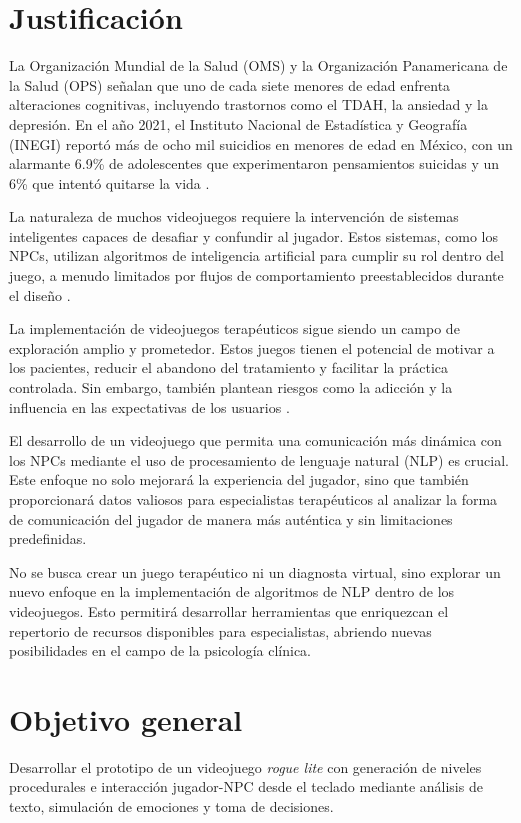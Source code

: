 \documentclass[12pt,twoside]{article}
\begin{document}
	\clearpage
	\section{Justificación}
	
	La Organización Mundial de la Salud (OMS) y la Organización Panamericana de la Salud (OPS) señalan que uno de cada siete menores de edad enfrenta alteraciones cognitivas, incluyendo trastornos como el TDAH, la ansiedad y la depresión. En el año 2021, el Instituto Nacional de Estadística y Geografía (INEGI) reportó más de ocho mil suicidios en menores de edad en México, con un alarmante 6.9\% de adolescentes que experimentaron pensamientos suicidas y un 6\% que intentó quitarse la vida \cite{info: justificacion1}.
 	
 	La naturaleza de muchos videojuegos requiere la intervención de sistemas inteligentes capaces de desafiar y confundir al jugador. Estos sistemas, como los NPCs, utilizan algoritmos de inteligencia artificial para cumplir su rol dentro del juego, a menudo limitados por flujos de comportamiento preestablecidos durante el diseño \cite{info: justificacion2}. 
 	
 	La implementación de videojuegos terapéuticos sigue siendo un campo de exploración amplio y prometedor. Estos juegos tienen el potencial de motivar a los pacientes, reducir el abandono del tratamiento y facilitar la práctica controlada. Sin embargo, también plantean riesgos como la adicción y la influencia en las expectativas de los usuarios \cite{info: justificacion3}.
 	
	 El desarrollo de un videojuego que permita una comunicación más dinámica con los NPCs mediante el uso de procesamiento de lenguaje natural (NLP) es crucial. Este enfoque no solo mejorará la experiencia del jugador, sino que también proporcionará datos valiosos para especialistas terapéuticos al analizar la forma de comunicación del jugador de manera más auténtica y sin limitaciones predefinidas.
	 
	 No se busca crear un juego terapéutico ni un diagnosta virtual, sino explorar un nuevo enfoque en la implementación de algoritmos de NLP dentro de los videojuegos. Esto permitirá desarrollar herramientas que enriquezcan el repertorio de recursos disponibles para especialistas, abriendo nuevas posibilidades en el campo de la psicología clínica.
 	
	\clearpage
	\section{Objetivo general}
	Desarrollar el prototipo de un videojuego \textit{rogue lite} con generación de niveles procedurales e interacción jugador-NPC desde el teclado mediante análisis de texto, simulación de emociones y toma de decisiones.
	
\end{document}
